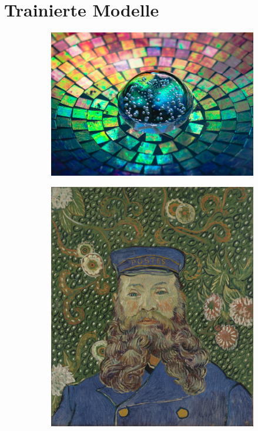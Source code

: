 \section{Trainierte Modelle}
\begin{figure}[H]
    \centering

    \begin{subfigure}[h]{0.32\textwidth}
        \centering
        \quad
    \end{subfigure}
    \begin{subfigure}[h]{0.32\textwidth}
        \centering
        \includegraphics[width=\textwidth]{resources/content/style/crystal_glass_on_a_colorful_background.jpg}
    \end{subfigure}
    \begin{subfigure}[h]{0.32\textwidth}
        \centering
        \includegraphics[width=\textwidth]{resources/content/style/portrait_of_joseph_roulin.jpg}
    \end{subfigure}



\end{figure}
